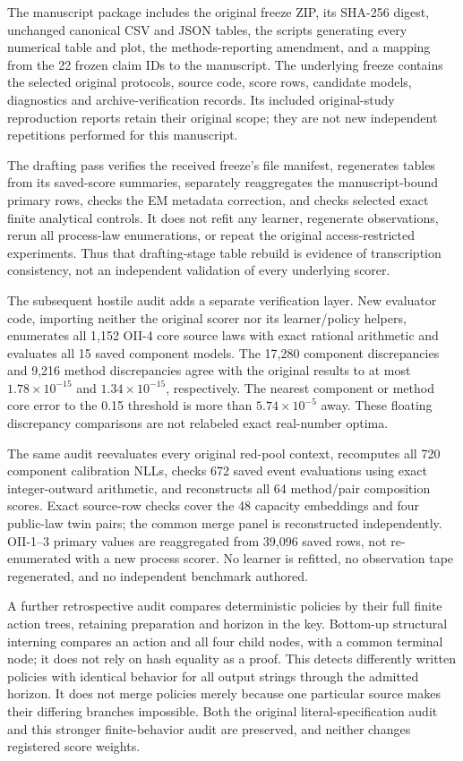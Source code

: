 The manuscript package includes the original freeze ZIP, its SHA-256 digest, unchanged canonical CSV and JSON tables, the scripts generating every numerical table and plot, the methods-reporting amendment, and a mapping from the 22 frozen claim IDs to the manuscript. The underlying freeze contains the selected original protocols, source code, score rows, candidate models, diagnostics and archive-verification records. Its included original-study reproduction reports retain their original scope; they are not new independent repetitions performed for this manuscript.

The drafting pass verifies the received freeze's file manifest, regenerates tables from its saved-score summaries, separately reaggregates the manuscript-bound primary rows, checks the EM metadata correction, and checks selected exact finite analytical controls. It does not refit any learner, regenerate observations, rerun all process-law enumerations, or repeat the original access-restricted experiments. Thus that drafting-stage table rebuild is evidence of transcription consistency, not an independent validation of every underlying scorer.

The subsequent hostile audit adds a separate verification layer. New evaluator code, importing neither the original scorer nor its learner/policy helpers, enumerates all 1,152 OII-4 core source laws with exact rational arithmetic and evaluates all 15 saved component models. The 17,280 component discrepancies and 9,216 method discrepancies agree with the original results to at most $1.78\times10^{-15}$ and $1.34\times10^{-15}$, respectively. The nearest component or method core error to the 0.15 threshold is more than $5.74\times10^{-5}$ away. These floating discrepancy comparisons are not relabeled exact real-number optima.

The same audit reevaluates every original red-pool context, recomputes all 720 component calibration NLLs, checks 672 saved event evaluations using exact integer-outward arithmetic, and reconstructs all 64 method/pair composition scores. Exact source-row checks cover the 48 capacity embeddings and four public-law twin pairs; the common merge panel is reconstructed independently. OII-1--3 primary values are reaggregated from 39,096 saved rows, not re-enumerated with a new process scorer. No learner is refitted, no observation tape regenerated, and no independent benchmark authored.

A further retrospective audit compares deterministic policies by their full finite action trees, retaining preparation and horizon in the key. Bottom-up structural interning compares an action and all four child nodes, with a common terminal node; it does not rely on hash equality as a proof. This detects differently written policies with identical behavior for all output strings through the admitted horizon. It does not merge policies merely because one particular source makes their differing branches impossible. Both the original literal-specification audit and this stronger finite-behavior audit are preserved, and neither changes registered score weights.

